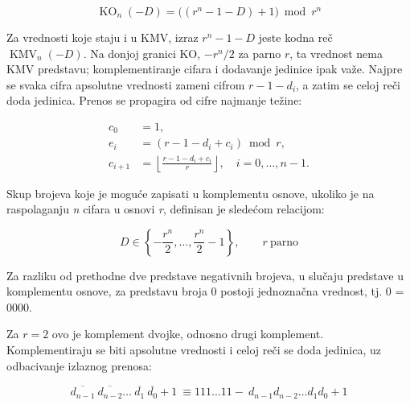 \documentclass[a4paper,11pt]{article}
\numberwithin{equation}{section}
\begin{document}
\begin{equation}\label{eq:1.2.3.2}
\operatorname{KO}_n(-D)=\bigl((r^n-1-D)+1\bigr)\bmod r^n
\end{equation}


Za vrednosti koje staju i u KMV, izraz $r^n-1-D$ jeste kodna reč $\operatorname{KMV}_n(-D)$. Na donjoj granici KO, $-r^n/2$ za parno $r$, ta vrednost nema KMV predstavu; komplementiranje cifara i dodavanje jedinice ipak važe. Najpre se svaka cifra apsolutne vrednosti zameni cifrom $r-1-d_i$, a zatim se celoj reči doda jedinica. Prenos se propagira od cifre najmanje težine:

\begin{equation}\label{eq:1.2.3.3}
\begin{aligned}c_0&=1,\\ e_i&=(r-1-d_i+c_i)\bmod r,\\ c_{i+1}&=\left\lfloor\frac{r-1-d_i+c_i}{r}\right\rfloor,\quad i=0,\dots,n-1.\end{aligned}
\end{equation}


Skup brojeva koje je moguće zapisati u komplementu osnove, ukoliko je na raspolaganju \emph{n} cifara u osnovi \emph{r}, definisan je sledećom relacijom:



\begin{equation}\label{eq:1.2.3.4}
D\in\left\{-\frac{r^n}{2},\dots,\frac{r^n}{2}-1\right\},\qquad r\ \text{parno}
\end{equation}


Za razliku od prethodne dve predstave negativnih brojeva, u slučaju predstave u komplementu osnove, za predstavu broja 0 postoji jednoznačna vrednost, tj. 0 = 0000.



Za $r=2$ ovo je komplement dvojke, odnosno drugi komplement. Komplementiraju se biti apsolutne vrednosti i celoj reči se doda jedinica, uz odbacivanje izlaznog prenosa:

\begin{equation}\label{eq:1.2.3.5}
\overline{d_{n - 1}}\ \overline{d_{n - 2}}\ldots\ \overline{d_{1}}\ \overline{d_{0}} + 1\  \equiv 111\ldots 11 - \ d_{n - 1}d_{n - 2}\ldots d_{1}d_{0} + 1
\end{equation}
\end{document}
